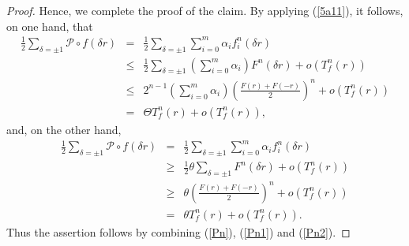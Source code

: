 \documentclass[10pt,a4paper]{amsart}
\begin{document}
\begin{proof}
    Hence, we complete the proof of the claim. By applying (\ref{5a11}), it follows, on one hand, that
    \begin{eqnarray}\label{Pn1}
        \frac{1}{2}\sum_{\delta=\pm 1}\mathcal{P}\circ f(\delta r)&=&\frac{1}{2}\sum_{\delta=\pm 1}\sum_{i=0}^{m}\alpha_{i}f_{i}^{n}(\delta r)\nonumber\\
        &\leq&\frac{1}{2}\sum_{\delta=\pm 1}\left(\sum_{i=0}^{m}\alpha_{i}\right)F^{n}(\delta r)+o(T_{f}^{n}(r))\nonumber\\
        &\leq&2^{n-1}\left(\sum_{i=0}^{m}\alpha_{i}\right)\left(\frac{F(r)+F(-r)}{2}\right)^{n}+o(T_{f}^{n}(r))\nonumber\\
        &=&\Theta T_{f}^{n}(r)+o(T_{f}^{n}(r)),
    \end{eqnarray}
    and, on the other hand, 
    \begin{eqnarray}\label{Pn2}
        \frac{1}{2}\sum_{\delta=\pm 1}\mathcal{P}\circ f(\delta r)&=&\frac{1}{2}\sum_{\delta=\pm 1}\sum_{i=0}^{m}\alpha_{i}f_{i}^{n}(\delta r)\nonumber\\
        &\geq&\frac{1}{2}\theta\sum_{\delta=\pm 1}F^{n}(\delta r)+o(T_{f}^{n}(r))\nonumber\\
        &\geq& \theta\left(\frac{F(r)+F(-r)}{2}\right)^{n}+o(T_{f}^{n}(r))\nonumber\\
        &=&\theta T_{f}^{n}(r)+o(T_{f}^{n}(r)).
    \end{eqnarray}
    Thus the assertion follows by combining (\ref{Pn}), (\ref{Pn1}) and (\ref{Pn2}).
\end{proof}
\end{document}
